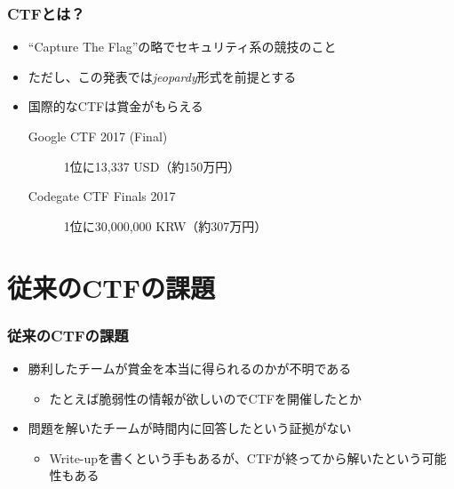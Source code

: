 \begin{frame}
  \frametitle{CTFとは？}

  \pause
  \begin{itemize}
    \item<+-> ``Capture The Flag''の略でセキュリティ系の競技のこと
    \item<+-> ただし、この発表では\emph{jeopardy}形式を前提とする
  \end{itemize}


  \begin{itemize}
    \item<+-> 国際的なCTFは賞金がもらえる
    \begin{description}
      \item[Google CTF 2017 (Final)] 1位に13,337 USD（約150万円）
      \item[Codegate CTF Finals 2017] 1位に30,000,000 KRW（約307万円）
    \end{description}
  \end{itemize}
\end{frame}

\section{従来のCTFの課題}

\begin{frame}
  \frametitle{従来のCTFの課題}

  \pause
  \begin{itemize}
    \item<+-> 勝利したチームが賞金を本当に得られるのかが不明である
    \begin{itemize}
      \item たとえば脆弱性の情報が欲しいのでCTFを開催したとか
    \end{itemize}

    \item<+-> 問題を解いたチームが時間内に回答したという証拠がない
    \begin{itemize}
      \item Write-upを書くという手もあるが、CTFが終ってから解いたという可能性もある
    \end{itemize}
  \end{itemize}
\end{frame}

